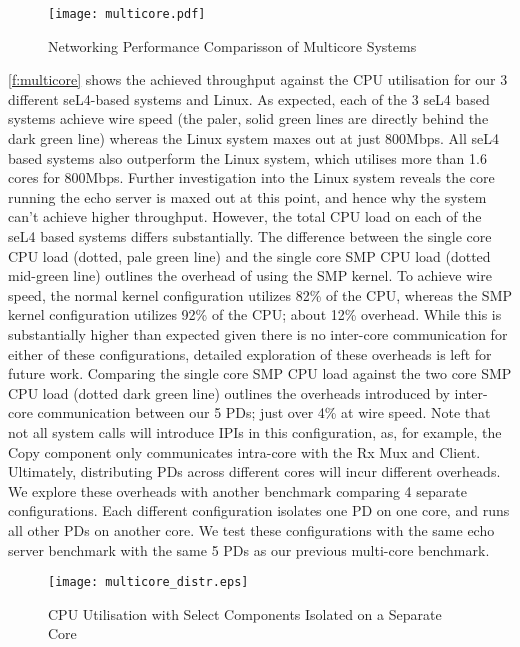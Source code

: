 \begin{figure}[h]
    \centering
    \texttt{[image: multicore.pdf]}
    \caption{Networking Performance Comparisson of Multicore Systems}
    \label{f:multicore}
\end{figure}

\autoref{f:multicore} shows the achieved throughput against the CPU utilisation for our 3 different seL4-based systems and Linux. 
As expected, each of the 3 seL4 based systems achieve wire speed (the paler, solid green lines are directly behind the dark green line)
whereas the Linux system maxes out at just 800Mbps. All seL4 based systems also outperform the Linux system, which utilises more than
1.6 cores for 800Mbps. Further investigation into the Linux system reveals the core running the echo server is maxed out at 
this point, and hence why the system can't achieve higher throughput. 
However, the total CPU load on each of the seL4 based systems differs substantially. 
The difference between the single core CPU load (dotted, pale green line) and the single core SMP CPU load (dotted mid-green line) 
outlines the overhead of using the SMP kernel. To achieve wire speed, the normal kernel configuration utilizes 82\% of the CPU, whereas
the SMP kernel configuration utilizes 92\% of the CPU; about 12\% overhead. While this is substantially higher than expected given
there is no inter-core communication for either of these configurations, detailed
exploration of these overheads is left for future work. 
Comparing the single core SMP CPU load against the two core SMP CPU load (dotted dark green line) outlines the overheads introduced by
inter-core communication between our 5 PDs; just over 4\% at wire speed. Note that not all system calls will introduce IPIs in
this configuration, as, for example, the Copy component only communicates intra-core with the Rx Mux and Client. \\

Ultimately, distributing PDs across different cores will incur different overheads. We explore these overheads with another benchmark
comparing 4 separate configurations. Each different configuration isolates one PD on one core, and runs all other PDs on another core. 
We test these configurations with the same echo server benchmark with the same 5 PDs as our previous multi-core benchmark.

\begin{figure}[h]
    \centering
    \texttt{[image: multicore\_distr.eps]}
    \caption{CPU Utilisation with Select Components Isolated on a Separate Core}
    \label{f:multicore_distr}
\end{figure}

